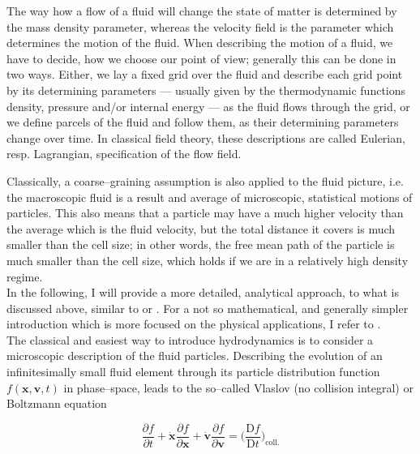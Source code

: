 The way how a flow of a fluid will change the state of matter is determined by the mass density parameter, whereas the velocity field is the parameter which determines the motion of the fluid.
When describing the motion of a fluid, we have to decide, how we choose our point of view; generally this can be done in two ways.
Either, we lay a fixed grid over the fluid and describe each grid point by its determining parameters --- usually given by the thermodynamic functions density, pressure and/or internal energy --- as the fluid flows through the grid, or we define parcels of the fluid and follow them, as their determining parameters change over time.
In classical field theory, these descriptions are called Eulerian, resp. Lagrangian, specification of the flow field.

Classically, a coarse--graining assumption is also applied to the fluid picture, i.e. the macroscopic fluid is a result and average of microscopic, statistical motions of particles.
This also means that a particle may have a much higher velocity than the average which is the fluid velocity, but the total distance it covers is much smaller than the cell size; in other words, the free mean path of the particle is much smaller than the cell size, which holds if we are in a relatively high density regime.
\\[6pt]
%
In the following, I will provide a more detailed, analytical approach, to what is discussed above, similar to \citet{Mihalas} or \citet{Shu_2}.
For a not so mathematical, and generally simpler introduction which is more focused on the physical applications, I refer to \citet{Castor}.
\\[6pt]
%
The classical and easiest way to introduce hydrodynamics is to consider a microscopic description of the fluid particles.
Describing the evolution of an infinitesimally small fluid element through its particle distribution function $f(\textbf{x}, \textbf{v}, t)$ in phase--space, leads to the so--called Vlaslov (no collision integral) or Boltzmann equation

\begin{equation}
  \frac{\partial f}{\partial t} + \dot{\textbf{x}} \frac{\partial f}{\partial \textbf{x}} + \dot{\textbf{v}} \frac{\partial f}{\partial \textbf{v}} = \Big(\frac{\mathrm{D}f}{\mathrm{D}t}\Big)_{\text{coll.}}
\label{eq:BoltzmannEQ}
\end{equation}

